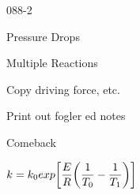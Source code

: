 \begin{mitframe}{088-2}
    
\begin{listone}
	\item Pressure Drops
	\item Multiple Reactions
    \item Copy driving force, etc.
    \item Print out fogler ed notes
	
    \item Comeback
	
    \item $\thermcond=\thermcond_{\init}exp\bigg[\dfrac{\energy}{\gasconst}\bigg(\dfrac{1}{\Temp_{\init}}-\dfrac{1}{\Temp_1}\bigg)\bigg]$
\end{listone}

\end{mitframe}
